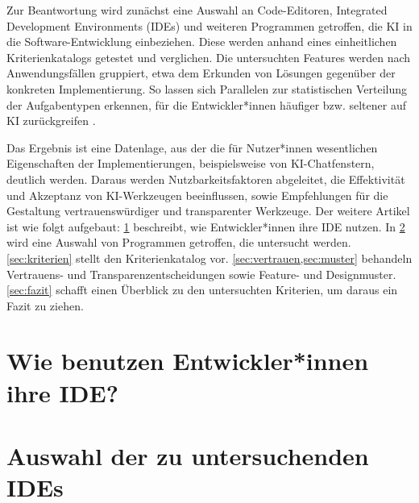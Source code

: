 \documentclass[ngerman]{seminarvorlage}
\begin{document}
Zur Beantwortung wird zunächst eine Auswahl an Code-Editoren, Integrated Development Environments (IDEs) und weiteren Programmen getroffen, die KI in die Software-Entwicklung einbeziehen. Diese werden anhand eines einheitlichen Kriterienkatalogs getestet und verglichen. Die untersuchten Features werden nach Anwendungsfällen gruppiert, etwa dem Erkunden von Lösungen gegenüber der konkreten Implementierung. So lassen sich Parallelen zur statistischen Verteilung der Aufgabentypen erkennen, für die Entwickler*innen häufiger bzw. seltener auf KI zurückgreifen \cite{barke2022groundedcopilotprogrammersinteract}.

Das Ergebnis ist eine Datenlage, aus der die für Nutzer*innen wesentlichen Eigenschaften der Implementierungen, beispielsweise von KI-Chatfenstern, deutlich werden. Daraus werden Nutzbarkeitsfaktoren abgeleitet, die Effektivität und Akzeptanz von KI-Werkzeugen beeinflussen, sowie Empfehlungen für die Gestaltung vertrauenswürdiger und transparenter Werkzeuge. Der weitere Artikel ist wie folgt aufgebaut: \cref{sec:nutzung} beschreibt, wie Entwickler*innen ihre IDE nutzen. In \cref{sec:auswahl} wird eine Auswahl von Programmen getroffen, die untersucht werden. \cref{sec:kriterien} stellt den Kriterienkatalog vor. \cref{sec:vertrauen,sec:muster} behandeln Vertrauens- und Transparenzentscheidungen sowie Feature- und Designmuster. \cref{sec:fazit} schafft einen Überblick zu den untersuchten Kriterien, um daraus ein Fazit zu ziehen.

\section{Wie benutzen Entwickler*innen ihre IDE?}\label{sec:nutzung}


\section{Auswahl der zu untersuchenden IDEs}\label{sec:auswahl}

\end{document}
